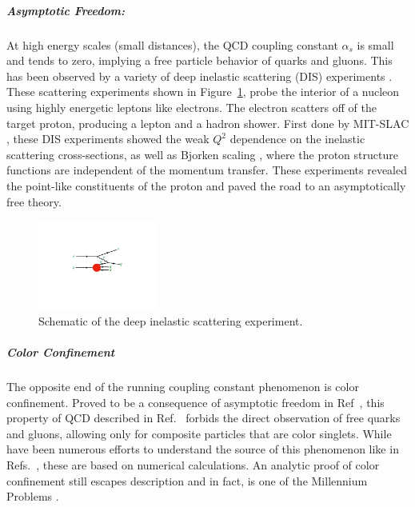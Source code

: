 \subparagraph{Asymptotic Freedom: }
At high energy scales (small distances), the QCD coupling constant $\alpha_s$ is small and tends to zero, implying a free particle behavior of quarks and gluons\cite{PhysRevLett.30.1343, PhysRevD.8.3633}.
This has been observed by a variety of deep inelastic scattering (DIS) experiments \cite{Deur:2014vea, Kim:1998kia, Altarelli:1996nm, RevModPhys.63.597, Kataev:2001kk, Alekhin:2012ig, Alekhin:2013nua, Blumlein:2006be, Aaron:2007xx, Chekanov:2007pa, Chekanov:2008af, Abramowicz:2010cka, Abramowicz:2010ke, Aaron:2009vs}.
These scattering experiments shown in Figure~\ref{fig:dis_schematic}, probe the interior of a nucleon using highly energetic leptons like electrons.
The electron scatters off of the target proton, producing a lepton and a hadron shower.
First done by MIT-SLAC \cite{PhysRevLett.23.930, PhysRevLett.23.935}, these DIS experiments showed the weak $Q^2$ dependence on the inelastic scattering cross-sections, as well as Bjorken scaling \cite{PhysRev.179.1547}, where the proton structure functions are independent of the momentum transfer.
These experiments revealed the point-like constituents of the proton and paved the road to an asymptotically free theory.

\begin{figure}[htbp]
\begin{center}
\includegraphics[width=0.35\textwidth]{figures/theory/DIS}
\caption{Schematic of the deep inelastic scattering experiment.}
\label{fig:dis_schematic}
\end{center}
\end{figure}


\subparagraph{Color Confinement}
The opposite end of the running coupling constant phenomenon is color confinement.
Proved to be a consequence of asymptotic freedom in Ref~\cite{Nishijima1996}, this property of QCD described in Ref.~\cite{PhysRevD.10.2445} forbids the direct observation of free quarks and gluons, allowing only for composite particles that are color singlets.
While have been numerous efforts to understand the source of this phenomenon like in Refs.~\cite{BUCHMULLER1982479, KOGUT1976199, PhysRevD.31.2910, PhysRevD.57.2603, PhysRevD.62.114503, RevModPhys.55.775, PhysRevLett.90.102001}, these are based on numerical calculations.
An analytic proof of color confinement still escapes description and in fact, is one of the Millennium Problems \cite{MillenniumProb}.


